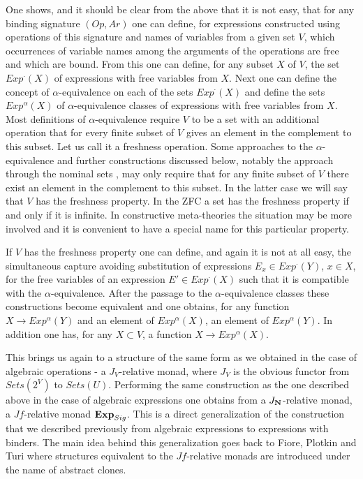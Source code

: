 \documentclass[12pt]{amsart}
\newcommand{\sr}{\rightarrow}
\newcommand{\nn}{{\bf N\rm}}
\newcommand{\nat}{\nn}
\begin{document}
One shows, and it should be clear from the above that it is not easy, that for any binding signature $(Op,Ar)$ one can define, for expressions constructed using operations of this signature and names of variables from a given set $V$, which occurrences of variable names among the arguments of the operations are free and which are bound. From this one can define, for any subset $X$ of $V$, the set $Exp^{\cdot}(X)$ of expressions with free variables from $X$. Next one can define the concept of $\alpha$-equivalence on each of the sets $Exp^{\cdot}(X)$ and define the sets $Exp^{\alpha}(X)$ of $\alpha$-equivalence classes of expressions with free variables from $X$. Most definitions of $\alpha$-equivalence require $V$ to be a set with an additional operation that for every finite subset of $V$ gives an element in the complement to this subset. Let us call it a freshness operation. Some approaches to the $\alpha$-equivalence and further constructions discussed below, notably the approach through the nominal sets \cite{Pitts}, may only require that for any finite subset of $V$ there exist an element in the complement to this subset. In the latter case we will say that $V$ has the freshness property. In the ZFC a set has the freshness property if and only if it is infinite. In constructive meta-theories the situation may be more involved and it is convenient to have a special name for this particular property.  

If $V$ has the freshness property one can define, and again it is not at all easy, the simultaneous capture avoiding substitution of expressions $E_x\in Exp^{\cdot}(Y)$, $x\in X$, for the free variables of an expression $E'\in Exp^{\cdot}(X)$ such that it is compatible with the $\alpha$-equivalence.  After the passage to the $\alpha$-equivalence classes these constructions become equivalent and one obtains, for any function $X\sr Exp^{\alpha}(Y)$ and an element of $Exp^{\alpha}(X)$, an element of $Exp^{\alpha}(Y)$. In addition one has, for any $X\subset V$, a function $X\sr Exp^{\alpha}(X)$. 

This brings us again to a structure of the same form as we obtained in the case of algebraic operations - a $J_V$-relative monad, where $J_V$ is the obvious functor from $Sets(2^V)$ to $Sets(U)$. Performing the same construction as the one described above in the case of algebraic expressions one obtains from a $J_{\nat}$-relative monad, a $Jf$-relative monad ${\bf Exp}_{Sig}$. This is a direct generalization of the construction that we described previously from algebraic expressions to expressions with binders. The main idea behind this generalization goes back to Fiore, Plotkin and Turi \cite{FPT} where structures equivalent to the $Jf$-relative monads are introduced under the name of abstract clones. 
\end{document}
